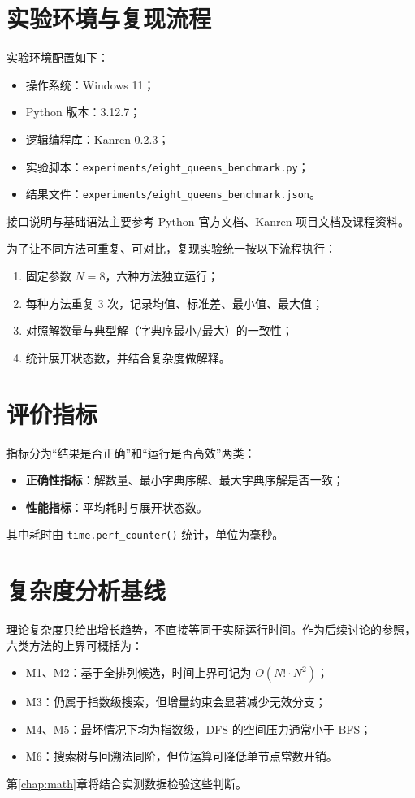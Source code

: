 \section{实验环境与复现流程}

实验环境配置如下：
\begin{itemize}
  \item 操作系统：Windows 11；
  \item Python 版本：3.12.7；
  \item 逻辑编程库：Kanren 0.2.3；
  \item 实验脚本：\texttt{experiments/eight\_queens\_benchmark.py}；
  \item 结果文件：\texttt{experiments/eight\_queens\_benchmark.json}。
\end{itemize}

接口说明与基础语法主要参考 Python 官方文档、Kanren 项目文档及课程资料\cite{python_docs,logpy_repo,runoob_python}。

为了让不同方法可重复、可对比，复现实验统一按以下流程执行：
\begin{enumerate}
  \item 固定参数 $N=8$，六种方法独立运行；
  \item 每种方法重复 3 次，记录均值、标准差、最小值、最大值；
  \item 对照解数量与典型解（字典序最小/最大）的一致性；
  \item 统计展开状态数，并结合复杂度做解释。
\end{enumerate}

\section{评价指标}

指标分为“结果是否正确”和“运行是否高效”两类：
\begin{itemize}
  \item \textbf{正确性指标}：解数量、最小字典序解、最大字典序解是否一致；
  \item \textbf{性能指标}：平均耗时与展开状态数。
\end{itemize}

其中耗时由 \texttt{time.perf\_counter()} 统计，单位为毫秒。

\section{复杂度分析基线}

理论复杂度只给出增长趋势，不直接等同于实际运行时间。作为后续讨论的参照，六类方法的上界可概括为：
\begin{itemize}
  \item M1、M2：基于全排列候选，时间上界可记为 $O(N!\cdot N^2)$；
  \item M3：仍属于指数级搜索，但增量约束会显著减少无效分支；
  \item M4、M5：最坏情况下均为指数级，DFS 的空间压力通常小于 BFS\cite{cormen2022}；
  \item M6：搜索树与回溯法同阶，但位运算可降低单节点常数开销。
\end{itemize}

第\ref{chap:math}章将结合实测数据检验这些判断。
